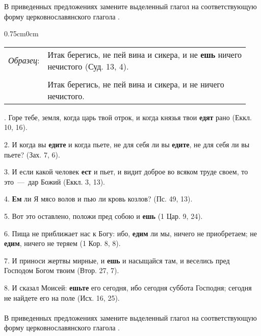 \documentclass[11pt,a4paper,oneside]{memoir}
\newcommand{\exercise}{}
\newcommand{\exanswer}{\ding{242}}
\newcommand{\hstbb}{0.75cm}
\begin{document}
В приведенных предложениях замените выделенный глагол на соответствующую форму церковнославянского глагола {}.

\medskip\begin{adjustwidth}{\hstbb}{0cm}
	\renewcommand*{\arraystretch}{1.2}
	\begin{tabular}[l]{rl}

		\emph{Образец}:
		 & \makecell[l]{Итак берегись, не пей вина и сикера, и не \textbf{ешь} ничего \\нечистого (Суд. 13, 4).}
		\\

		 &
		\\

		\exanswer
		 & \makecell[l]{Итак берегись, не пей вина и сикера, и не {\slv{ꙗ҆́ждь}} ничего \\нечистого.}
		\\
	\end{tabular}
\end{adjustwidth}

. Горе тебе, земля, когда царь твой отрок, и когда князья твои \textbf{едят} рано (Еккл. 10, 16).

2. И когда вы \textbf{едите} и когда пьете, не для себя ли вы \textbf{едите}, не для себя ли вы пьете? (Зах. 7, 6).

3. И если какой человек \textbf{ест} и пьет, и видит доброе во всяком труде своем, то это~---~дар Божий (Еккл. 3, 13).

4. \textbf{Ем} ли Я мясо волов и пью ли кровь козлов? (Пс. 49, 13).

5. Вот это оставлено, положи пред собою и \textbf{ешь} (1 Цар. 9, 24).

6. Пища не приближает нас к Богу: ибо, \textbf{едим} ли мы, ничего не приобретаем; не \textbf{едим}, ничего не теряем (1 Кор. 8, 8).

7. И приноси жертвы мирные, и \textbf{ешь} и насыщайся там, и веселись пред Господом Богом твоим (Втор. 27, 7).

8. И сказал Моисей: \textbf{ешьте} его сегодня, ибо сегодня суббота Господня; сегодня не найдете его на поле (Исх. 16, 25).

\paragraph{\exercise}

В приведенных предложениях замените выделенный глагол на соответствующую форму церковнославянского глагола {}.
\end{document}
